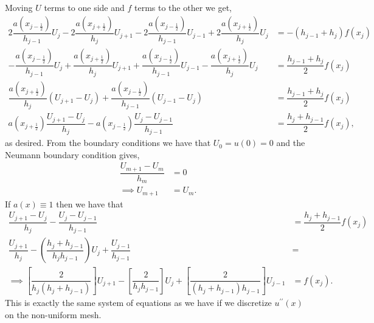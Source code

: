 \documentclass[12pt]{article}
\begin{document}
Moving $U$ terms to one side and $f$ terms to the other we get,
\begin{subequations}
    \begin{align}
        2\dfrac{a\left(x_{j-\frac{1}{2}}\right)}{h_{j-1}}U_{j}
        -2\dfrac{a\left(x_{j+\frac{1}{2}}\right)}{h_{j}}U_{j+1}
        - 2\dfrac{a\left(x_{j-\frac{1}{2}}\right)}{h_{j-1}}U_{j-1}
        + 2\dfrac{a\left(x_{j+\frac{1}{2}}\right)}{h_{j}}U_{j} &= -(h_{j-1}+h_{j}) f(x_{j})\\
        -\dfrac{a\left(x_{j-\frac{1}{2}}\right)}{h_{j-1}}U_{j}
        +\dfrac{a\left(x_{j+\frac{1}{2}}\right)}{h_{j}}U_{j+1}
        +\dfrac{a\left(x_{j-\frac{1}{2}}\right)}{h_{j-1}}U_{j-1}
        -\dfrac{a\left(x_{j+\frac{1}{2}}\right)}{h_{j}}U_{j} &= \dfrac{h_{j-1}+h_{j}}{2} f(x_{j})\label{eq:2b_b4_group}\\
        \dfrac{a\left(x_{j+\frac{1}{2}}\right)}{h_{j}}(U_{j+1}-U_{j})
        +\dfrac{a\left(x_{j-\frac{1}{2}}\right)}{h_{j-1}}(U_{j-1}-U_{j})
        &= \dfrac{h_{j-1}+h_{j}}{2} f(x_{j})\\
        a\left(x_{j+\frac{1}{2}}\right)\dfrac{U_{j+1}-U_{j}}{h_{j}}
        - a\left(x_{j-\frac{1}{2}}\right)\dfrac{U_{j}-U_{j-1}}{h_{j-1}}
        &= \dfrac{h_{j} + h_{j-1}}{2} f(x_{j}),
    \end{align}
\end{subequations}
as desired. From the boundary conditions we have that $U_{0} = u(0) = 0$ and the Neumann boundary condition gives,
\begin{subequations}
   \begin{align}
       \dfrac{U_{m+1}-U_{m}}{h_{m}} &= 0\\
       \implies U_{m+1} &= U_{m}.
   \end{align}
\end{subequations}
If $a(x) \equiv 1$ then we have that
\begin{subequations}
    \begin{align}
       \dfrac{U_{j+1}-U_{j}}{h_{j}}
        - \dfrac{U_{j}-U_{j-1}}{h_{j-1}}
        &= \dfrac{h_{j} + h_{j-1}}{2} f(x_{j})\\
         \dfrac{U_{j+1}}{h_{j}} - \left(\dfrac{h_{j}+h_{j-1}}{h_{j}h_{j-1}}\right)U_{j}
        + \dfrac{U_{j-1}}{h_{j-1}} &=\\
        \implies \left[\dfrac{2}{h_{j}(h_{j}+h_{j-1})}\right]U_{j+1}-\left[\dfrac{2}{h_{j}h_{j-1}}\right]U_{j}
        +\left[\dfrac{2}{(h_{j}+h_{j-1})h_{j-1}}\right]U_{j-1} &= f(x_{j}).
    \end{align}
\end{subequations}
This is exactly the same system of equations as we have if we discretize $u^{\prime\prime}(x)$ on the non-uniform mesh.
\end{document}
